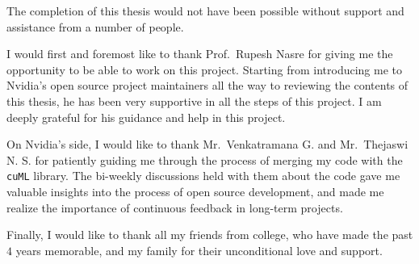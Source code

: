 \acknowledgements

The completion of this thesis would not have been possible without support and assistance from a number of people. 

I would first and foremost like to thank Prof.~Rupesh Nasre for giving me the opportunity to be able to work on this project. Starting from introducing me to Nvidia's open source project maintainers all the way to reviewing the contents of this thesis, he has been very supportive in all the steps of this project. I am deeply grateful for his guidance and help in this project. 

On Nvidia's side, I would like to thank Mr.~Venkatramana G. and Mr.~Thejaswi N. S. for patiently guiding me through the process of merging my code with the \texttt{cuML} library. The bi-weekly discussions held with them about the code gave me valuable insights into the process of open source development, and made me realize the importance of continuous feedback in long-term projects. 

Finally, I would like to thank all my friends from college, who have made the past $4$ years memorable, and my family for their unconditional love and support.
